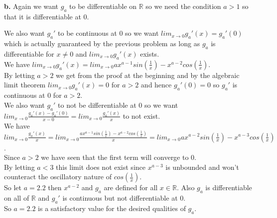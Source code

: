 \documentclass{article}
\begin{document}
\newpage
{\Large\textbf{b.}} Again we want $g_a$ to be differentiable on $\mathbb{R}$ so we need the condition $a > 1$ so that it is differentiable at 0.
\begin{center}
    \doublespacing
    We also want $g_a '$ to be continuous at 0 so we want $lim_{x\rightarrow 0} g_a '(x) = g_a '(0)$ which is actually guaranteed by the previous problem as long as $g_a$ is differentiable for $x\neq 0$ and $lim_{x\rightarrow 0} g_a '(x)$ exists.
    \\We have $lim_{x\rightarrow 0} g_a '(x) = lim_{x\rightarrow 0} a x^{a-1} sin(\frac{1}{x}) - x^{a-2} cos(\frac{1}{x})$.
    \\By letting $a > 2$ we get from the proof at the beginning and by the algebraic limit theorem $lim_{x\rightarrow 0} g_a '(x) = 0$ for $a > 2$ and hence $g_a '(0) = 0$ so $g_a '$ is continuous at 0 for $a > 2$.
    \\We also want $g_a '$ to not be differentiable at 0 so we want $lim_{x\rightarrow 0}\frac{g_a '(x) - g_a '(0)}{x - 0} = lim_{x\rightarrow 0}\frac{g_a ' (x)}{x}$ to not exist.
    \\We have $lim_{x\rightarrow 0}\frac{g_a ' (x)}{x} = lim_{x\rightarrow 0}\frac{a x^{a-1} sin(\frac{1}{x}) - x^{a-2} cos(\frac{1}{x})}{x} = lim_{x\rightarrow 0} a x^{a-2} sin(\frac{1}{x}) - x^{a-3} cos(\frac{1}{x})$.
    \\Since $a > 2$ we have seen that the first term will converge to 0.
    \\By letting $a < 3$ this limit does not exist since $x^{a-3}$ is unbounded and won't counteract the oscillatory nature of $cos(\frac{1}{x})$.
    \\So let $a = 2.2$ then $x^{a-2}$ and $g_a$ are defined for all $x\in\mathbb{R}$. Also $g_a$ is differentiable on all of $\mathbb{R}$ and $g_a '$ is continuous but not differentiable at 0.
    \\So $a = 2.2$ is a satisfactory value for the desired qualities of $g_a$.
\end{center}
\end{document}
